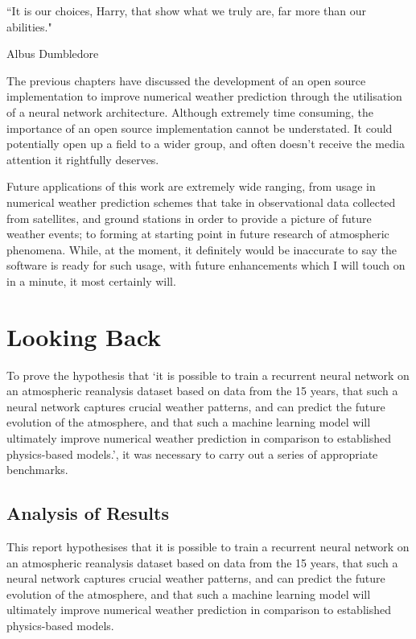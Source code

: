 \epigraph{``It is our choices, Harry, that show what we truly are, far more than our abilities."}{Albus Dumbledore}

The previous chapters have discussed the development of an open source implementation to improve numerical weather prediction through the utilisation of a neural network architecture. Although extremely time consuming, the importance of an open source implementation cannot be understated. It could potentially open up a field to a wider group, and often doesn't receive the media attention it rightfully deserves. 

Future applications of this work are extremely wide ranging, from usage in numerical weather prediction schemes that take in observational data collected from satellites, and ground stations in order to provide a picture of future weather events; to forming at starting point in future research of atmospheric phenomena. While, at the moment, it definitely would be inaccurate to say the software is ready for such usage, with future enhancements which I will touch on in a minute, it most certainly will.

\section{Looking Back}
To prove the hypothesis that `it is possible to train a recurrent neural network on an atmospheric reanalysis dataset based on data from the 15 years, that such a neural network captures crucial weather patterns, and can predict the future evolution of the atmosphere, and that such a machine learning model will ultimately improve numerical weather prediction in comparison to established physics-based models.', it was necessary to carry out a series of appropriate benchmarks.

\subsection{Analysis of Results}
This report hypothesises that it is possible to train a recurrent neural network on an atmospheric reanalysis dataset based on data from the 15 years, that such a neural network captures crucial weather patterns, and can predict the future evolution of the atmosphere, and that such a machine learning model will ultimately improve numerical weather prediction in comparison to established physics-based models.

